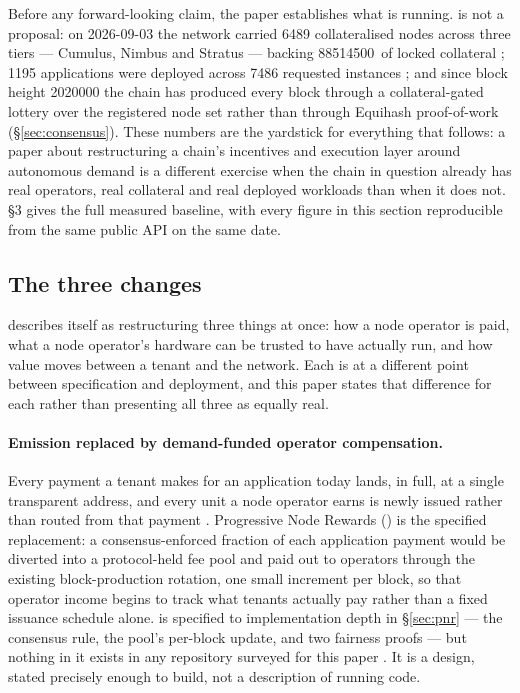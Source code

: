 Before any forward-looking claim, the paper establishes what is running. \Flux is not a proposal: on
2026-09-03 the network carried \num{6489} collateralised nodes across three tiers — Cumulus,
Nimbus and Stratus — backing \num{88514500}\flux\ of locked collateral
\shipped {}; \num{1195} applications were
deployed across \num{7486} requested instances
\shipped {}; and since block
height \num{2020000} the chain has produced every block through a collateral-gated lottery over the
registered node set rather than through Equihash proof-of-work
\shipped {} (\S\ref{sec:consensus}). These numbers are the
yardstick for everything that follows: a paper about restructuring a chain's incentives and execution
layer around autonomous demand is a different exercise when the chain in question already has real
operators, real collateral and real deployed workloads than when it does not. \S3 gives the full
measured baseline, with every figure in this section reproducible from the same public API on the
same date.

\subsection{The three changes}
\label{sec:intro-changes}

\Flux describes itself as restructuring three things at once: how a node operator is paid, what a
node operator's hardware can be trusted to have actually run, and how value moves between a tenant
and the network. Each is at a different point between specification and deployment, and this paper
states that difference for each rather than presenting all three as equally real.

\paragraph{Emission replaced by demand-funded operator compensation.}
Every payment a tenant makes for an application today lands, in full, at a single transparent
address, and every unit a node operator earns is newly issued rather than routed from that payment
\shipped {}. Progressive Node
Rewards (\PNR) is the specified replacement: a consensus-enforced fraction of each application
payment would be diverted into a protocol-held fee pool and paid out to operators through the
existing block-production rotation, one small increment per block, so that operator income begins to
track what tenants actually pay rather than a fixed issuance schedule alone. \PNR is specified to
implementation depth in \S\ref{sec:pnr} — the consensus rule, the pool's per-block update, and two
fairness proofs — but nothing in it exists in any repository surveyed for this paper
\planned {}. It is a design, stated precisely enough to build, not
a description of running code.

